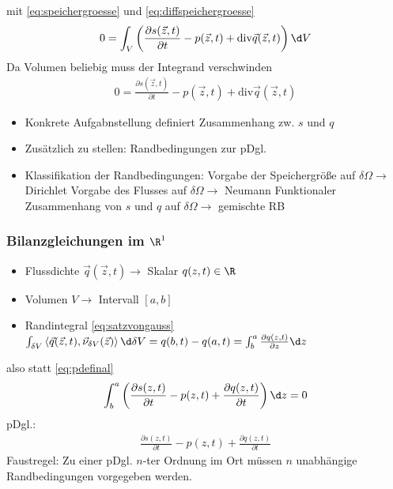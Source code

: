  mit \ref{eq:speichergroesse} und \ref{eq:diffspeichergroesse}
 \begin{align}
 \label{eq:pdefinal}
 0 =  \int _V \left( \frac{\partial s(\vec{z},t)}{\partial t}-p(\vec{z},t)+\mathrm{div} \vec{q}(\vec{z},t) \right) \d V
 \end{align}
 Da Volumen beliebig muss der Integrand verschwinden
 \begin{align}
 0 = \frac{\partial s(\vec{z},t)}{\partial t}-p(\vec{z},t)+\mathrm{div} \vec{q}(\vec{z},t) 
 \end{align}
 \begin{itemize}
 \item Konkrete Aufgabnstellung definiert Zusammenhang zw. $s$ und $q$
\item Zusätzlich zu stellen: Randbedingungen zur pDgl.
\item Klassifikation der Randbedingungen: 
\subitem Vorgabe der Speichergröße auf $\delta \Omega \rightarrow $ Dirichlet
\subitem Vorgabe des Flusses auf $\delta \Omega \rightarrow $ Neumann
\subitem Funktionaler Zusammenhang von $s$ und $q$ auf $\delta \Omega \rightarrow$ gemischte RB
 \end{itemize}
 \subsubsection{Bilanzgleichungen im $\R^1$}
 \begin{itemize}
 \item Flussdichte $\vec{q}(\vec{z},t) \rightarrow$ Skalar $q(z,t) \in \R$
 \item Volumen $V \rightarrow$ Intervall $[a,b]$
 \item Randintegral \ref{eq:satzvongauss} $\int_{\delta V} \left\langle  \vec{q}(\vec{z},t),\vec{\nu}_{\delta V}(\vec{z})\right\rangle \d  \delta V = q(b,t)-q(a,t) = \int_b^a \frac{\partial q(z,t)}{\partial z}\d z$
 \end{itemize}
 also statt \ref{eq:pdefinal}
 \begin{align}
 \int_b^a \left( \frac{\partial s(z,t)}{\partial t}-p(z,t)+\frac{\partial q(z,t)}{\partial t} \right) \d z = 0
 \end{align}
 pDgl.:
 \begin{align}
 \frac{\partial s(z,t)}{\partial t}-p(z,t)+\frac{\partial q(z,t)}{\partial t}
 \end{align}
 Faustregel: Zu einer pDgl. $n$-ter Ordnung im Ort müssen $n$ unabhängige Randbedingungen vorgegeben werden.
